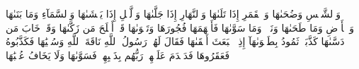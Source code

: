 وَٱلشَّمۡسِ وَضُحَىٰهَا
وَٱلۡقَمَرِ إِذَا تَلَىٰهَا
وَٱلنَّهَارِ إِذَا جَلَّىٰهَا
وَٱلَّيۡلِ إِذَا يَغۡشَىٰهَا
وَٱلسَّمَآءِ وَمَا بَنَىٰهَا
وَٱلۡأَرۡضِ وَمَا طَحَىٰهَا
وَنَفۡسٖ وَمَا سَوَّىٰهَا
فَأَلۡهَمَهَا فُجُورَهَا وَتَقۡوَىٰهَا
قَدۡ أَفۡلَحَ مَن زَكَّىٰهَا
وَقَدۡ خَابَ مَن دَسَّىٰهَا
كَذَّبَتۡ ثَمُودُ بِطَغۡوَىٰهَآ
إِذِ ٱنۢبَعَثَ أَشۡقَىٰهَا
فَقَالَ لَهُمۡ رَسُولُ ٱللَّهِ نَاقَةَ ٱللَّهِ وَسُقۡيَٰهَا
فَكَذَّبُوهُ فَعَقَرُوهَا فَدَمۡدَمَ عَلَيۡهِمۡ رَبُّهُم بِذَنۢبِهِمۡ فَسَوَّىٰهَا
وَلَا يَخَافُ عُقۡبَٰهَا